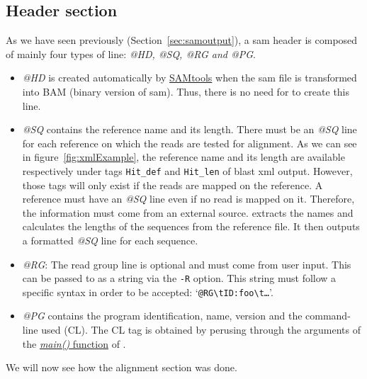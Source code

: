 \subsection{Header section}\label{subsec:header}
As we have seen previously (Section~\ref{sec:samoutput}), a \gls{sam} header is composed of mainly four types of line: \emph{@HD, @SQ, @RG and @PG}.
\begin{itemize}
    \item \emph{@HD} is created automatically by \href{http://www.htslib.org/}{SAMtools} when the \gls{sam} file is transformed into BAM (binary version of \gls{sam}).
    Thus, there is no need for \blastobam{} to create this line.
    \item \emph{@SQ} contains the reference name and its length. There must be an \emph{@SQ} line for each reference on which the reads are tested for alignment.
    As we can see in figure~\ref{fig:xmlExample}, the reference name and its length are available respectively under tags \texttt{Hit\_def} and \texttt{Hit\_len} of \gls{blast} \gls{xml} output.
    However, those tags will only exist if the reads are mapped on the reference.
    A reference must have an \emph{@SQ} line even if no read is mapped on it.
    Therefore, the information must come from an external source.
    \blastobam{} extracts the names and calculates the lengths of the sequences from the reference file.
    It then outputs a formatted \emph{@SQ} line for each sequence.
    \item \emph{@RG}: The read group line is optional and must come from user input.
    This can be passed to \blastobam{} as a string via the \texttt{-R} option.
    This string must follow a specific syntax in order to be accepted: `\texttt{@RG\textbackslash{}tID:foo\textbackslash{}t\ldots}'.
    \item \emph{@PG} contains the program identification, name, version and the command-line used (CL).
    The CL tag is obtained by perusing through the arguments of the \href{https://github.com/guyduche/Blast2Bam/blob/master/src/main.c}{\emph{main()} function} of \blastobam{}.
\end{itemize}
We will now see how the alignment section was done.


